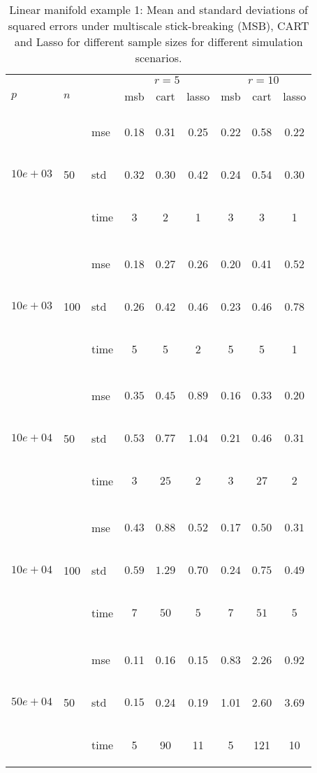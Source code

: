 \documentclass{article} %
\newcommand{\efoo}{\end{footnotesize}}
\newcommand{\bfoo}{\begin{footnotesize}}
\begin{document}
\begin{table}[t]
\caption{Linear manifold example 1: Mean and standard deviations of squared errors under multiscale stick-breaking (MSB), CART and Lasso for different sample sizes for different simulation scenarios.}\label{table:linear1}
\vskip 0.15in
\begin{center}
\begin{small}
\begin{sc}
\begin{tabular}{lllcccccc}
\hline
&&&\multicolumn{3}{c}{$r=5$}&\multicolumn{3}{c}{$r=10$}\\
$p$&$n$& & msb&cart&lasso & msb&cart&lasso \\
\\
\multirow{3}{*}{$10e+03$}&\multirow{3}{*}{50}&\bfoo mse\efoo&0.18&0.31&0.25&0.22&0.58&0.22\\
&&\bfoo std\efoo &0.32&0.30&0.42&0.24&0.54&0.30\\
&&\bfoo time\efoo &3&2&1&3&3&1\\

\\
\multirow{3}{*}{$10e+03$}&\multirow{3}{*}{100}&\bfoo mse\efoo&0.18&0.27&0.26&0.20&0.41&0.52\\
&&\bfoo std\efoo & 0.26&0.42&0.46&0.23&0.46&0.78\\
&&\bfoo time\efoo &5&5& 2&5&5&1\\

\\
\multirow{3}{*}{$10e+04$}&\multirow{3}{*}{50}&\bfoo mse\efoo&$0.35$&$0.45$&$0.89$&$0.16$&$0.33$&$0.20$\\
&&\bfoo std\efoo &$0.53$ &$0.77$&$1.04$&$0.21$&$0.46$&$0.31$\\
&&\bfoo time\efoo &$3$&$25$&$2$&$3$&$27$&$2$\\
\\
\multirow{3}{*}{$10e+04$}&\multirow{3}{*}{100}&\bfoo mse\efoo&$0.43$&$0.88$&$0.52$&$0.17$&$0.50$&$0.31$\\
&&\bfoo std\efoo &$0.59$ &$1.29$&$0.70$&$0.24$ &$0.75$&$0.49$\\
&&\bfoo time\efoo &$7$&$50$&$5$&$7$&$51$&$5$\\
\\
\multirow{3}{*}{$50e+04$}&\multirow{3}{*}{50}&\bfoo mse\efoo&0.11&0.16&0.15&0.83&2.26&0.92\\
&&\bfoo std\efoo&$0.15$ &0.24&0.19&1.01&2.60&3.69\\
&&\bfoo time\efoo &5&90&11&5&121&10\\



\end{tabular}
\end{sc}
\end{small}
\end{center}
\end{table}
\end{document}
